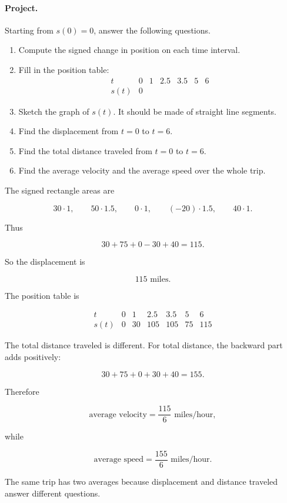 \paragraph{Project.}
Starting from \(s(0)=0\), answer the following questions.

\begin{enumerate}
\item Compute the signed change in position on each time interval.
\item Fill in the position table:
\[
\begin{array}{c|cccccc}
t & 0 & 1 & 2.5 & 3.5 & 5 & 6 \\ \hline
s(t) & 0 & & & & &
\end{array}
\]
\item Sketch the graph of \(s(t)\). It should be made of straight line segments.
\item Find the displacement from \(t=0\) to \(t=6\).
\item Find the total distance traveled from \(t=0\) to \(t=6\).
\item Find the average velocity and the average speed over the whole trip.
\end{enumerate}

The signed rectangle areas are

\[
30\cdot 1,\qquad
50\cdot 1.5,\qquad
0\cdot 1,\qquad
(-20)\cdot 1.5,\qquad
40\cdot 1.
\]

Thus

\[
30+75+0-30+40=115.
\]

So the displacement is

\[
115\text{ miles}.
\]

The position table is

\[
\begin{array}{c|cccccc}
t & 0 & 1 & 2.5 & 3.5 & 5 & 6 \\ \hline
s(t) & 0 & 30 & 105 & 105 & 75 & 115
\end{array}
\]

The total distance traveled is different. For total distance, the backward part adds positively:

\[
30+75+0+30+40=155.
\]

Therefore

\[
\text{average velocity}
=
\frac{115}{6}\text{ miles/hour},
\]

while

\[
\text{average speed}
=
\frac{155}{6}\text{ miles/hour}.
\]

The same trip has two averages because displacement and distance traveled answer different questions.

